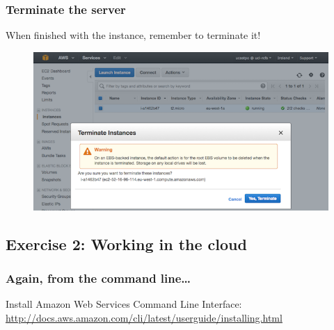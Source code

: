 \begin{Shaded}
\begin{Highlighting}[]
       \KeywordTok{__|}  \KeywordTok{__|_}  \NormalTok{)}
       \KeywordTok{_|} \DataTypeTok{\textbackslash{}(}     \KeywordTok{/}   
      \KeywordTok{___|}\DataTypeTok{\textbackslash{}\textbackslash{}}\KeywordTok{___|___|}

\NormalTok{[} \NormalTok{~]$}
\end{Highlighting}
\end{Shaded}

\subsubsection{Terminate the server}\label{terminate-the-server}

When finished with the instance, remember to terminate it!

\begin{figure}[htbp]
\centering
\includegraphics{96Cloud/figures/terminate_instance.png}
\end{figure}

\subsection{Exercise 2: Working in the
cloud}\label{exercise-2-working-in-the-cloud}

\subsubsection{Again, from the command
line\ldots{}}\label{again-from-the-command-line}

Install Amazon Web Services Command Line
Interface:\\\url{http://docs.aws.amazon.com/cli/latest/userguide/installing.html}

